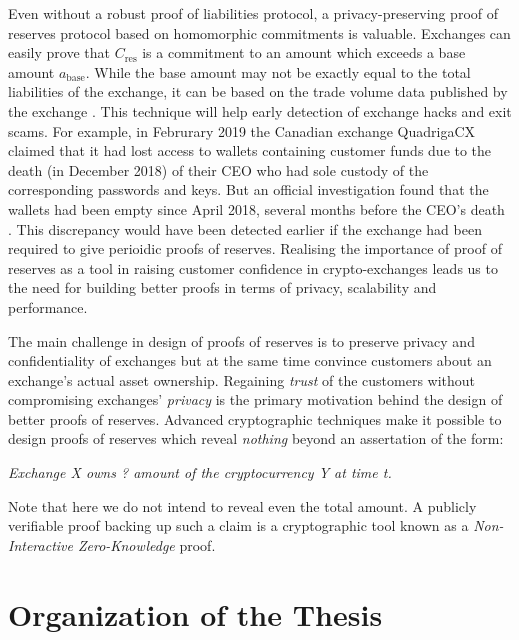 Even without a robust proof of liabilities protocol, a privacy-preserving proof of reserves protocol based on homomorphic commitments is valuable. 
Exchanges can easily prove that $C_{\text{res}}$ is a commitment to an amount which exceeds a base amount $a_{\text{base}}$. While the base amount may not be exactly equal to the total liabilities of the exchange, it can be based on the trade volume data published by the exchange \cite{Coinmarketcap}. 
This technique will help early detection of exchange hacks and exit scams. 
For example, in Februrary 2019 the Canadian exchange QuadrigaCX claimed that it had lost access to wallets containing customer funds due to the death (in December 2018) of their CEO who had sole custody of the corresponding passwords and keys. But an official investigation found that the wallets had been empty since April 2018, several months before the CEO's death \cite{QuadrigaCXEmpty, EYThirdReport}. This discrepancy would have been detected earlier if the exchange had been required to give perioidic proofs of reserves.
Realising the importance of proof of reserves as a tool in raising customer confidence in crypto-exchanges leads us to the need for building better proofs in terms of privacy, scalability and performance.    

The main challenge in design of proofs of reserves is to preserve privacy and confidentiality of exchanges but at the same time convince customers about an exchange's actual asset ownership.
Regaining \textit{trust} of the customers without compromising exchanges' \textit{privacy} is the primary motivation behind the design of better proofs of reserves. 
Advanced cryptographic techniques make it possible to design proofs of reserves which reveal \textit{nothing} beyond an assertation of the form:
\begin{center}
    \textit{Exchange X owns ? amount of the cryptocurrency Y at time t.}
\end{center}
Note that here we do not intend to reveal even the total amount. 
A publicly verifiable proof backing up such a claim is a cryptographic tool known as a \textit{Non-Interactive Zero-Knowledge} proof.

\section{Organization of the Thesis}

